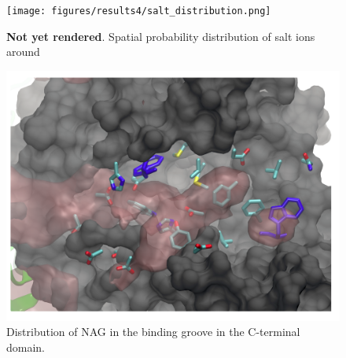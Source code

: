 \begin{figure}[htbp]
\centering
\texttt{[image: figures/results4/salt\_distribution.png]}
\caption[Ionic distribution]{\textbf{Not yet rendered}. Spatial probability distribution of salt ions around \pgab}
\label{fig:salt_density_distribution}
\end{figure}

\begin{figure}[htbp]
\centering
\includegraphics[width=6.23in]{figures/results4/nag_cterminal_zoomedin.png}
\caption{Distribution of NAG in the binding groove in the C-terminal domain.}
\label{fig:nag_cterminal_zoomedin}
\end{figure}


\begin{singlespace}


\end{singlespace}




